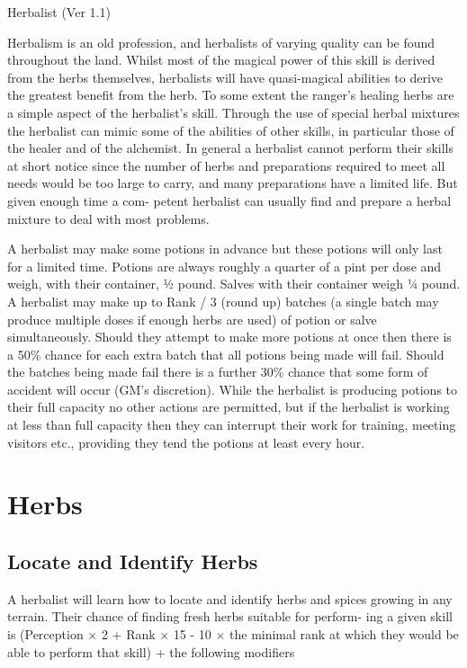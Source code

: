 \begin{Chapter}{Herbalist (Ver 1.1)}

Herbalism is an old profession, and herbalists of varying quality can
be found throughout the land.  Whilst most of the magical power of
this skill is derived from the herbs themselves, herbalists will have
quasi-magical abilities to derive the greatest benefit from the
herb. To some extent the ranger’s healing herbs are a simple aspect of
the herbalist’s skill.  Through the use of special herbal mixtures the
herbalist can mimic some of the abilities of other skills, in
particular those of the healer and of the alchemist. In general a
herbalist cannot perform their skills at short notice since the number
of herbs and preparations required to meet all needs would be too
large to carry, and many preparations have a limited life. But given
enough time a com- petent herbalist can usually find and prepare a
herbal mixture to deal with most problems.

A herbalist may make some potions in advance but these potions will
only last for a limited time.  Potions are always roughly a quarter of
a pint per dose and weigh, with their container, ½ pound.  Salves with
their container weigh ¼ pound.  A herbalist may make up to Rank / 3
(round up) batches (a single batch may produce multiple doses if
enough herbs are used) of potion or salve simultaneously.  Should they
attempt to make more potions at once then there is a 50\% chance for
each extra batch that all potions being made will fail.  Should the
batches being made fail there is a further 30\% chance that some form
of accident will occur (GM’s discretion).  While the herbalist is
producing potions to their full capacity no other actions are
permitted, but if the herbalist is working at less than full capacity
then they can interrupt their work for training, meeting visitors
etc., providing they tend the potions at least every hour.

\section{Herbs}

\subsection{Locate and Identify Herbs}

A herbalist will learn how to locate and identify herbs and spices
growing in any terrain.  Their chance of finding fresh herbs suitable
for perform- ing a given skill is (Perception × 2 + Rank × 15 - 10 ×
the minimal rank at which they would be able to perform that skill) +
the following modifiers


\end{Chapter}
